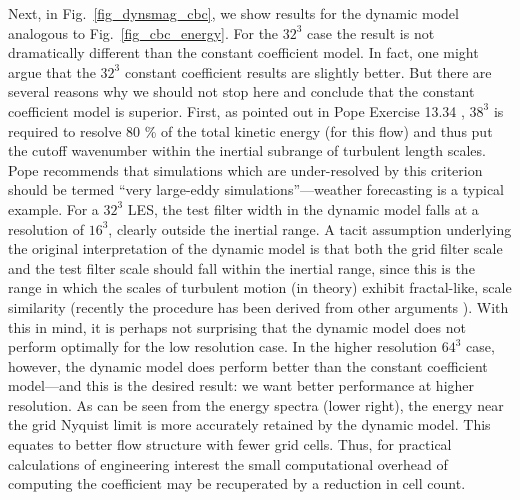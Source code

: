 \documentclass[11pt]{book}
\begin{document}
Next, in Fig.~\ref{fig_dynsmag_cbc}, we show results for the dynamic model analogous to Fig.~\ref{fig_cbc_energy}.  For the $32^3$ case the result is not dramatically different than the constant coefficient model.  In fact, one might argue that the $32^3$ constant coefficient results are slightly better.  But there are several reasons why we should not stop here and conclude that the constant coefficient model is superior.  First, as pointed out in Pope Exercise 13.34 \cite{Pope:2000}, $38^3$ is required to resolve 80 \% of the total kinetic energy (for this flow) and thus put the cutoff wavenumber within the inertial subrange of turbulent length scales.  Pope recommends that simulations which are under-resolved by this criterion should be termed ``very large-eddy simulations''---weather forecasting is a typical example.  For a $32^3$ LES, the test filter width in the dynamic model falls at a resolution of $16^3$, clearly outside the inertial range.  A tacit assumption underlying the original interpretation of the dynamic model is that both the grid filter scale and the test filter scale should fall within the inertial range, since this is the range in which the scales of turbulent motion (in theory) exhibit fractal-like, scale similarity (recently the procedure has been derived from other arguments \cite{Pope:2004}).  With this in mind, it is perhaps not surprising that the dynamic model does not perform optimally for the low resolution case.  In the higher resolution $64^3$ case, however, the dynamic model does perform better than the constant coefficient model---and this is the desired result: we want better performance at higher resolution.  As can be seen from the energy spectra (lower right), the energy near the grid Nyquist limit is more accurately retained by the dynamic model.  This equates to better flow structure with fewer grid cells.  Thus, for practical calculations of engineering interest the small computational overhead of computing the coefficient may be recuperated by a reduction in cell count.
\end{document}
